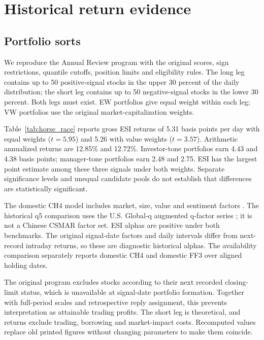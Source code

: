 \section{Historical return evidence}\label{sec:baseline_return_predictability}
\subsection{Portfolio sorts}
We reproduce the Annual Review program with the original scores, sign restrictions, quantile cutoffs, position limits and eligibility rules. The long leg contains up to 50 positive-signal stocks in the upper 30 percent of the daily distribution; the short leg contains up to 50 negative-signal stocks in the lower 30 percent. Both legs must exist. EW portfolios give equal weight within each leg; VW portfolios use the original market-capitalization weights.

Table~\ref{tab:horse_race} reports gross ESI returns of 5.31 basis points per day with equal weights ($t=5.95$) and 5.26 with value weights ($t=3.57$). Arithmetic annualized returns are 12.85\% and 12.72\%. Investor-tone portfolios earn 4.43 and 4.38 basis points; manager-tone portfolios earn 2.48 and 2.75. ESI has the largest point estimate among these three signals under both weights. Separate significance levels and unequal candidate pools do not establish that differences are statistically significant.

The domestic CH4 model includes market, size, value and sentiment factors \citep{liu2019}. The historical q5 comparison uses the U.S. Global-q augmented q-factor series \citep{hou2021}; it is not a Chinese CSMAR factor set. ESI alphas are positive under both benchmarks. The original signal-date factors and daily intervals differ from next-record intraday returns, so these are diagnostic historical alphas. The availability comparison separately reports domestic CH4 and domestic FF3 over aligned holding dates.

The original program excludes stocks according to their next recorded closing-limit status, which is unavailable at signal-date portfolio formation. Together with full-period scales and retrospective reply assignment, this prevents interpretation as attainable trading profits. The short leg is theoretical, and returns exclude trading, borrowing and market-impact costs. Recomputed values replace old printed figures without changing parameters to make them coincide.


